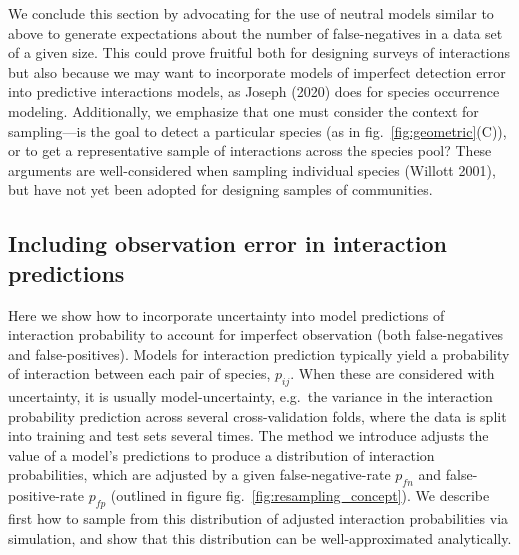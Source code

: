 \documentclass[11pt]{article}
\begin{document}
We conclude this section by advocating for the use of neutral models
similar to above to generate expectations about the number of
false-negatives in a data set of a given size. This could prove fruitful
both for designing surveys of interactions but also because we may want
to incorporate models of imperfect detection error into predictive
interactions models, as Joseph (2020) does for species occurrence
modeling. Additionally, we emphasize that one must consider the context
for sampling---is the goal to detect a particular species (as in
fig.~\ref{fig:geometric}(C)), or to get a representative sample of
interactions across the species pool? These arguments are
well-considered when sampling individual species (Willott 2001), but
have not yet been adopted for designing samples of communities.

\hypertarget{including-observation-error-in-interaction-predictions}{%
\subsection{Including observation error in interaction
predictions}\label{including-observation-error-in-interaction-predictions}}

Here we show how to incorporate uncertainty into model predictions of
interaction probability to account for imperfect observation (both
false-negatives and false-positives). Models for interaction prediction
typically yield a probability of interaction between each pair of
species, \(p_{ij}\). When these are considered with uncertainty, it is
usually model-uncertainty, e.g.~the variance in the interaction
probability prediction across several cross-validation folds, where the
data is split into training and test sets several times. The method we
introduce adjusts the value of a model's predictions to produce a
distribution of interaction probabilities, which are adjusted by a given
false-negative-rate \(p_{fn}\) and false-positive-rate \(p_{fp}\)
(outlined in figure fig.~\ref{fig:resampling_concept}). We describe
first how to sample from this distribution of adjusted interaction
probabilities via simulation, and show that this distribution can be
well-approximated analytically.
\end{document}
